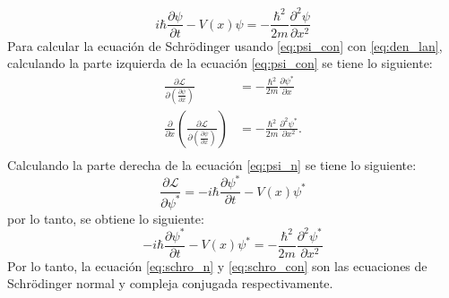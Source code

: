 \begin{equation}
    i\hbar \frac{\partial \psi}{\partial t} - V(x)\psi = -\frac{\hbar^2}{2m} \frac{\partial^2 \psi}{\partial x^2}
    \label{eq:schro_n}
\end{equation}
Para calcular la ecuación de Schr\"odinger usando  \ref{eq:psi_con} con \ref{eq:den_lan}, calculando la parte izquierda de la ecuación \ref{eq:psi_con} se tiene lo siguiente:
\begin{align*}
    \frac{\partial \mathcal{L}}{\partial\left(\frac{\partial \psi}{\partial x}\right)}&= -\frac{\hbar^2}{2m} \frac{\partial \psi^*}{\partial x}\\
    \frac{\partial}{\partial x}\left( \frac{\partial \mathcal{L}}{\partial\left(\frac{\partial \psi}{\partial x}\right)}\right) &= -\frac{\hbar^2}{2m} \frac{\partial^2 \psi^*}{\partial x^2}.\\
\end{align*}
Calculando la parte derecha de la ecuación \ref{eq:psi_n} se tiene lo siguiente:
\begin{equation*}
    \frac{\partial \mathcal{L} } {\partial \psi^*}= -i\hbar \frac{\partial \psi^*}{\partial t} - V(x)\psi^*
\end{equation*}
por lo tanto, se obtiene lo siguiente:
\begin{equation}
    -i\hbar \frac{\partial \psi^*}{\partial t} - V(x)\psi^* = -\frac{\hbar^2}{2m} \frac{\partial^2 \psi^*}{\partial x^2}
    \label{eq:schro_con}
\end{equation}
Por lo tanto, la ecuación \ref{eq:schro_n} y \ref{eq:schro_con} son las ecuaciones de Schr\"odinger normal y compleja conjugada respectivamente. 